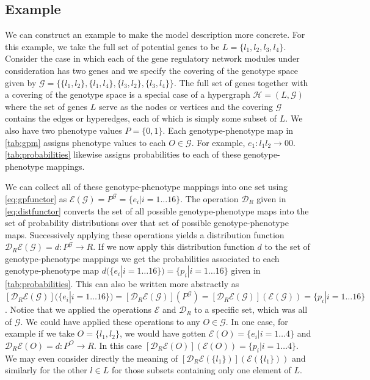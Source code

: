 \subsection{Example}\label{sec:example}
We can construct an example to make the model description more concrete. For this example, we take the full set of potential genes to be $L = \{ l_1,l_2,l_3,l_4 \}$. Consider the case in which each of the gene regulatory network modules under consideration has two genes and we specify the covering of the genotype space given by $\mathcal{G} = \{\{l_1,l_2 \},\{l_1,l_4 \},\{l_3,l_2\},\{l_3,l_4\} \}$. The full set of genes together with a covering of the genotype space is a special case of a hypergraph $\mathcal{H} = (L,\mathcal{G})$ where the set of genes $L$ serve as the nodes or vertices and the covering $\mathcal{G}$ contains the edges or hyperedges, each of which is simply some subset of $L$. We also have two phenotype values $P = \{0, 1\}$. Each genotype-phenotype map in \ref{tab:gpm} assigns phenotype values to each $O \in \mathcal{G}$. For example, $e_1 \colon   l_1 l_2 \rightarrow 00$. \ref{tab:probabilities} likewise assigns probabilities to each of these genotype-phenotype mappings.

We can collect all of these genotype-phenotype mappings into one set using \ref{eq:gpfunctor} as $\mathcal{E}(\mathcal{G}) = P^{\mathcal{G}} = \{e_i | i=1 \ldots 16 \}$. The operation $\mathcal{D}_R$ given in \ref{eq:distfunctor} converts the set of all possible genotype-phenotype maps into the set of probability distributions over that set of possible genotype-phenotype maps. Successively applying these operations yields a distribution function $\mathcal{D}_R\mathcal{E}(\mathcal{G})=d \colon P^\mathcal{G} \rightarrow R$. If we now apply this distribution function $d$ to the set of genotype-phenotype mappings we get the probabilities associated to each genotype-phenotype map $d(\{e_i | i=1 \ldots 16 \}) = \{p_i|i=1 \ldots 16\}$ given in \ref{tab:probabilities}. This can also be written more abstractly as $\left[\mathcal{D}_R\mathcal{E}(\mathcal{G})\right](\{e_i | i=1 \ldots 16 \}) = \left[\mathcal{D}_R\mathcal{E}(\mathcal{G})\right](P^\mathcal{G}) = \left[\mathcal{D}_R\mathcal{E}(\mathcal{G})\right](\mathcal{E}(\mathcal{G})) = \{p_i|i=1 \ldots 16\}$. Notice that we applied the operations $\mathcal{E}$ and $\mathcal{D}_R$ to a specific set, which was all of $\mathcal{G}$. We could have applied these operations to any $O \in \mathcal{G}$. In one case, for example if we take $O = \{l_1, l_2\}$, we would have gotten $\mathcal{E}(O) = \{e_i|i=1 \ldots 4\}$ and $\mathcal{D}_R\mathcal{E}(O) = d \colon P^O \rightarrow R$. In this case $\left[\mathcal{D}_R\mathcal{E}(O)\right](\mathcal{E}(O)) = \{p_i|i=1 \ldots 4\}$. We may even consider directly the meaning of $\left[\mathcal{D}_R\mathcal{E}(\{l_1\})\right](\mathcal{E}(\{l_1\}))$ and similarly for the other $l \in L$ for those subsets containing only one element of $L$.

